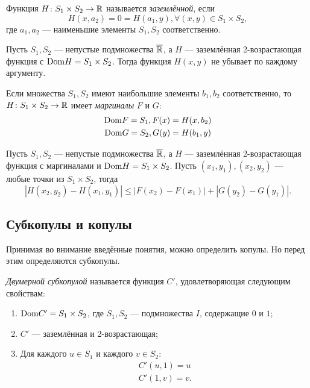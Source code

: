 \begin{define}
	Функция $H \colon S_1 \times S_2 \to \mathbb{R}$ называется \emph{заземлённой}, если
\[
H(x, a_2) = 0 = H(a_1, y), \forall (x, y) \in S_1 \times S_2,
\]
где $a_1, a_2$ --- наименьшие элементы $S_1, S_2$ соответственно.
\end{define}

\begin{lemma}
	Пусть $S_1, S_2$ --- непустые подмножества $\overline{\mathbb{R}}$, а $H$ --- заземлённая 2-возрастающая функция с $\mathrm{Dom}{H} = S_1 \times S_2$. Тогда функция $H(x, y)$ не убывает по каждому аргументу.
\end{lemma}

\begin{define}
	Если множества $S_1, S_2$ имеют наибольшие элементы $b_1, b_2$ соответственно, то $H \colon S_1 \times S_2 \to \mathbb{R}$ имеет \emph{маргиналы} $F$ и $G$:
	\begin{gather}
		\mathrm{Dom}{F} = S_1, F(x) = H(x, b_2) \\
		\mathrm{Dom}{G} = S_2, G(y) = H(b_1, y)
	\end{gather}
\end{define}

\begin{lemma}\label{lm:precont}
	Пусть $S_1, S_2$ --- непустые подмножества $\overline{\mathbb{R}}$, а $H$ --- заземлённая 2-возрастающая функция с маргиналами и $\mathrm{Dom}{H} = S_1 \times S_2$. Пусть $(x_1, y_1), (x_2, y_2)$ --- любые точки из $S_1 \times S_2$, тогда
\[
|H(x_2, y_2) - H(x_1, y_1)| \leqslant |F(x_2) - F(x_1)| + |G(y_2) - G(y_1)|.
\]
\end{lemma}

\subsection*{Субкопулы и копулы}

Принимая во внимание введённые понятия, можно определить копулы. Но перед этим определяются субкопулы\cite{Nelsen1999}.

\begin{define}
	\emph{Двумерной субкопулой} называется функция $C'$, удовлетворяющая следующим свойствам:
	\begin{enumerate}
	\item $\mathrm{Dom}{C'} = S_1 \times S_2$, где $S_1, S_2$ --- подмножества $I$, содержащие $0$ и $1$;
	\item $C'$ --- заземлённая и 2-возрастающая;
	\item Для каждого $u \in S_1$ и каждого $v \in S_2$:
		\begin{gather}
			C'(u, 1) = u \\
			C'(1, v) = v.
		\end{gather}
	\end{enumerate}
\end{define}

